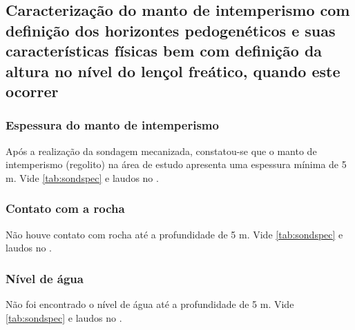 \subsection{Caracterização do manto de intemperismo com definição dos horizontes pedogenéticos e suas características físicas bem com definição da altura no nível do lençol freático, quando este ocorrer}

\subsubsection*{Espessura do manto de intemperismo}

Após a realização da sondagem mecanizada, constatou-se que o manto de intemperismo (regolito) na área de estudo apresenta uma espessura mínima de 5 m. Vide \cref{tab:sondspec} e laudos no .

\subsubsection*{Contato com a rocha}

Não houve contato com rocha até a profundidade de 5 m.
Vide \cref{tab:sondspec} e
laudos no .

\subsubsection*{Nível de água}

Não foi encontrado o nível de água até a profundidade de 5 m.
Vide \cref{tab:sondspec} e
laudos no .
